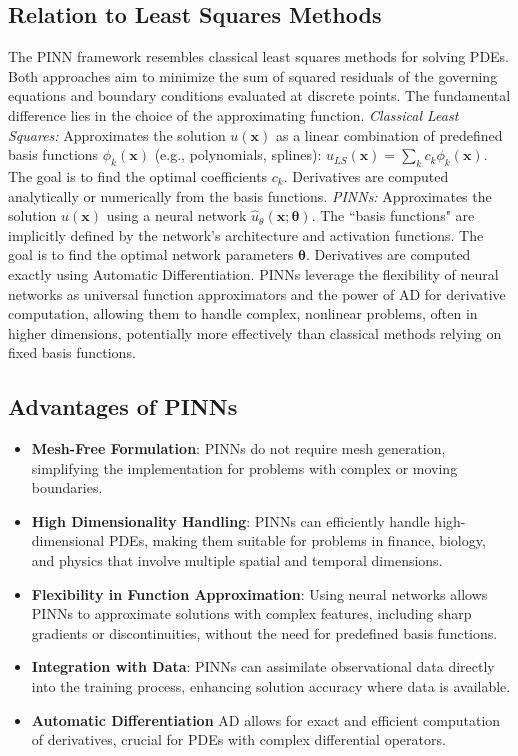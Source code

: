 \subsection{Relation to Least Squares Methods}

The PINN framework resembles classical least squares methods for solving PDEs. Both approaches aim to minimize the sum of squared residuals of the governing equations and boundary conditions evaluated at discrete points.
The fundamental difference lies in the choice of the approximating function. \textit{Classical Least Squares:} Approximates the solution $u(\mathbf{x})$ as a linear combination of predefined basis functions $\phi_k(\mathbf{x})$ (e.g., polynomials, splines): $u_{LS}(\mathbf{x}) = \sum_k c_k \phi_k(\mathbf{x})$. The goal is to find the optimal coefficients $c_k$. Derivatives are computed analytically or numerically from the basis functions. 
\textit{PINNs:} Approximates the solution $u(\mathbf{x})$ using a neural network $\hat{u}_\theta(\mathbf{x}; \boldsymbol{\theta})$. The ``basis functions" are implicitly defined by the network's architecture and activation functions. The goal is to find the optimal network parameters $\boldsymbol{\theta}$. Derivatives are computed exactly using Automatic Differentiation.
PINNs leverage the flexibility of neural networks as universal function approximators and the power of AD for derivative computation, allowing them to handle complex, nonlinear problems, often in higher dimensions, potentially more effectively than classical methods relying on fixed basis functions.

\subsection{Advantages of PINNs}
\begin{itemize}
    \item \textbf{Mesh-Free Formulation}: PINNs do not require mesh generation, simplifying the implementation for problems with complex or moving boundaries.

    \item \textbf{High Dimensionality Handling}: PINNs can efficiently handle high-dimensional PDEs, making them suitable for problems in finance, biology, and physics that involve multiple spatial and temporal dimensions.

    \item \textbf{Flexibility in Function Approximation}:  Using neural networks allows PINNs to approximate solutions with complex features, including sharp gradients or discontinuities, without the need for predefined basis functions.

    \item \textbf{Integration with Data}: PINNs can assimilate observational data directly into the training process, enhancing solution accuracy where data is available.

    \item \textbf{Automatic Differentiation}
AD allows for exact and efficient computation of derivatives, crucial for PDEs with complex differential operators.
\end{itemize}

